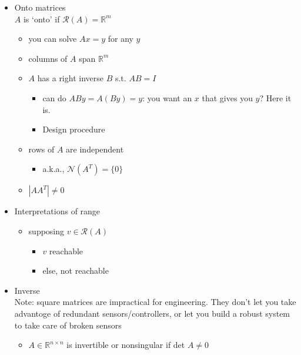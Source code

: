 \documentclass[10pt,letterpaper]{article}
\begin{document}
\begin{itemize}

\item Onto matrices\\
\label{sec-2_2_4_1}%
$A$ is `onto' if $\mathcal{R}(A)=\mathbb{R}^m$
\begin{itemize}
\item you can solve $Ax=y$ for any $y$
\item columns of $A$ span $\mathbb{R}^m$
\item $A$ has a right inverse $B$ s.t. $AB=I$

\begin{itemize}
\item can do $ABy=A(By)=y$: you want an $x$ that gives you $y$? Here it is.
\item Design procedure
\end{itemize}

\item rows of $A$ are independent

\begin{itemize}
\item a.k.a., $\mathcal{N}(A^T)=\{0\}$
\end{itemize}

\item $|AA^T|\ne 0$
\end{itemize}

\item Interpretations of range
\label{sec-2_2_4_2}%
\begin{itemize}
\item supposing $v \in \mathcal{R}(A)$

\begin{itemize}
\item $v$ reachable
\item else, not reachable
\end{itemize}

\end{itemize}


\item Inverse\\
\label{sec-2_2_4_3}%
Note: square matrices are impractical for engineering. They don't let you take advantoge of redundant sensors/controllers, or let you build a robust system to take care of broken sensors
\begin{itemize}
\item $A \in \mathbb{R}^{n \times n}$ is invertible or nonsingular if det $A \ne 0$


\end{itemize}
\end{itemize}
\end{document}
